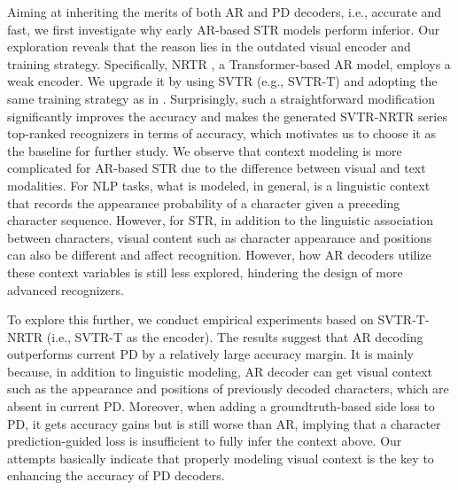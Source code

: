\documentclass[10pt,journal,compsoc]{IEEEtran}
\begin{document}
Aiming at inheriting the merits of both AR and PD decoders, i.e., accurate and fast, we first investigate why early AR-based STR models perform inferior. Our exploration reveals that the reason lies in the outdated visual encoder and training strategy. Specifically, NRTR \cite{Sheng2019nrtr}, a Transformer-based AR model, employs a weak encoder. We upgrade it by using SVTR (e.g., SVTR-T) \cite{duijcai2022svtr} and adopting the same training strategy as in \cite{fang2021abinet}. Surprisingly, such a straightforward modification significantly improves the accuracy and makes the generated SVTR-NRTR series top-ranked recognizers in terms of accuracy, which motivates us to choose it as the baseline for further study. We observe that context modeling is more complicated for AR-based STR due to the difference between visual and text modalities. For NLP tasks, what is modeled, in general, is a linguistic context that records the appearance probability of a character given a preceding character sequence. However, for STR, in addition to the linguistic association between characters, visual content such as character appearance and positions can also be different and affect recognition. However, how AR decoders utilize these context variables is still less explored, hindering the design of more advanced recognizers. 


To explore this further, we conduct empirical experiments based on SVTR-T-NRTR (i.e., SVTR-T as the encoder). The results suggest that AR decoding outperforms current PD by a relatively large accuracy margin. It is mainly because, in addition to linguistic modeling, AR decoder can get visual context such as the appearance and positions of previously decoded characters, which are absent in current PD. Moreover, when adding a groundtruth-based side loss to PD, it gets accuracy gains but is still worse than AR, implying that a character prediction-guided loss is insufficient to fully infer the context above. Our attempts basically indicate that properly modeling visual context is the key to enhancing the accuracy of PD decoders.
\end{document}
